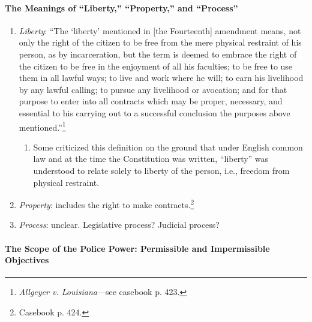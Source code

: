 \paragraph{The Meanings of ``Liberty,'' ``Property,'' and ``Process''}

\begin{enumerate}
    \item \emph{Liberty}: ``The `liberty' mentioned in [the Fourteenth] 
    amendment means, not only the right of the citizen to be free from the 
    mere physical restraint of his person, as by incarceration, but the term 
    is deemed to embrace the right of the citizen to be free in the enjoyment 
    of all his faculties; to be free to use them in all lawful ways; to live 
    and work where he will; to earn his livelihood by any lawful calling; to 
    pursue any livelihood or avocation; and for that purpose to enter into all 
    contracts which may be proper, necessary, and essential to his carrying 
    out to a successful conclusion the purposes above 
    mentioned.''\footnote{\emph{Allgeyer v. Louisiana}---see casebook p. 423.}
    \begin{enumerate}
        \item Some criticized this definition on the ground that under English 
        common law and at the time the Constitution was written, ``liberty'' 
        was understood to relate solely to liberty of the person, i.e., 
        freedom from physical restraint.
    \end{enumerate}
    \item \emph{Property}: includes the right to make 
    contracts.\footnote{Casebook p. 424.}
    \item \emph{Process}: unclear. Legislative process? Judicial process?
\end{enumerate}

\paragraph{The Scope of the Police Power: Permissible and Impermissible 
Objectives}

